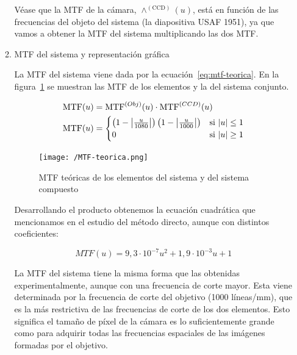 \documentclass{./packages/optica-article}
\newcommand\MTF{\textrm{MTF}}
\begin{document}
\begin{enumerate}
\begin{enumerate}
		            Véase que la MTF de la cámara, $\wedge^{(\textrm{CCD})}(u)$, está en función de las frecuencias del objeto del sistema (la diapositiva USAF 1951), ya que vamos a obtener la MTF del sistema multiplicando las dos MTF.


		      \item MTF del sistema y representación gráfica

		            La MTF del sistema viene dada por la ecuación~\ref{eq:mtf-teorica}. En la figura~\ref{fig:mtf-teorica} se muestran las MTF de los elementos y la del sistema conjunto.

		            \begin{align}
			            \MTF(u) & = \MTF^{(Obj)}(u) \cdot \MTF^{(CCD)}(u) \\
			            \MTF(u) & =
			            \begin{cases}
				            \left(1-\abs{\frac{u}{1080}}\right)\left(1-\abs{\frac{u}{1000}}\right) & \textrm{si   $|u| \leq 1$} \\
				            0                                                                      & \textrm{si  $|u| \geq 1$}
			            \end{cases}
			            \label{eq:mtf-teorica}
		            \end{align}

		            \begin{figure}
			            \centering
			            \texttt{[image: /MTF-teorica.png]}
			            \caption{MTF teóricas de los elementos del sistema y del sistema compuesto}
			            \label{fig:mtf-teorica}
		            \end{figure}

		            Desarrollando el producto obtenemos la ecuación cuadrática que mencionamos en el estudio del método directo, aunque con distintos coeficientes:

		            \begin{equation*}
			            MTF(u) = 9,3 \cdot 10^{-7} u^2 + 1,9 \cdot 10^{-3} u + 1
		            \end{equation*}

		            La MTF del sistema tiene la misma forma que las obtenidas experimentalmente, aunque con una frecuencia de corte mayor. Esta viene determinada por la frecuencia de corte del objetivo (1000 líneas/mm), que es la más restrictiva de las frecuencias de corte de los dos elementos. Esto significa el tamaño de píxel de la cámara es lo suficientemente grande como para adquirir todas las frecuencias espaciales de las imágenes formadas por el objetivo.


\end{enumerate}
\end{enumerate}
\end{document}
